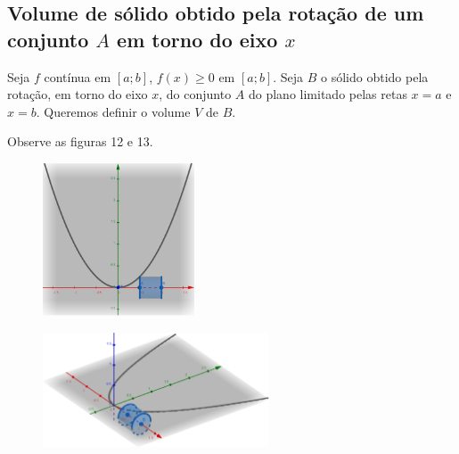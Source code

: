 \documentclass{article}
\begin{document}
{\begin{newpage}
\subsection{Volume de sólido obtido pela rotação de um conjunto $A$ em torno do eixo $x$}
\hspace{12pt} Seja $f$ contínua em $[a;b]$, $f(x)\geq 0$ em $[a;b]$. Seja $B$ o sólido obtido pela rotação, em torno do eixo $x$, do conjunto $A$ do plano limitado pelas retas $x=a$ e $x=b$. Queremos definir o volume $V$ de $B$.
\par Observe as figuras 12 e 13.
\begin{figure}[htbp]
\begin{center}
\includegraphics[width=0.4\textwidth, angle=0]{Grafico15.png}
\end{center}
\caption{}
\end{figure}

\begin{figure}[htbp]
\begin{center}
\includegraphics[width=0.6\textwidth, angle=0]{Grafico16.png}
\end{center}
\caption{}
\end{figure}


\end{newpage}}
\end{document}
